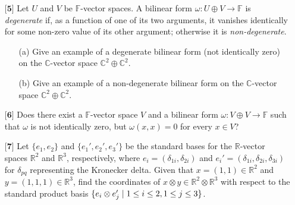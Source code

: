 \documentclass[12pt]{article}
\begin{document}
\begin{itemize}
    \vspace{.5cm}
    \item[$\textbf{[5]}$]
    Let $U$ and $V$ be $\mathbb{F}$-vector spaces. A bilinear form $\omega: U \oplus V \rightarrow \mathbb{F}$ is \textit{degenerate} if, as a function of one of its two arguments, it vanishes identically for some non-zero value of its other argument; otherwise it is \textit{non-degenerate}.
    \begin{itemize}
    
    \vspace{.3cm}
    \item[(a)]
    Give an example of a degenerate bilinear form (not identically zero) on the $\mathbb{C}$-vector space $\mathbb{C}^2 \oplus \mathbb{C}^2$.
    
    \vspace{.3cm}
    \item[(b)]
    Give an example of a non-degenerate bilinear form on the $\mathbb{C}$-vector space $\mathbb{C}^2 \oplus \mathbb{C}^2$.  
    
    \end{itemize}
    
    \vspace{.5cm}
    \item[$\textbf{[6]}$]
    Does there exist a $\mathbb{F}$-vector space $V$ and a bilinear form $\omega: V \oplus V \rightarrow \mathbb{F}$ such that $\omega$ is not identically zero, but $\omega(x,x) = 0$ for every $x \in V$?
    
    \vspace{.5cm}
    \item[$\textbf{[7]}$]
    Let $\{e_1,e_2\}$ and $\{e_1',e_2',e_3'\}$ be the standard bases for the $\mathbb{R}$-vector spaces $\mathbb{R}^2$ and $\mathbb{R}^3$, respectively, where \newline $e_i = (\delta_{1i},\delta_{2i})$ and $e_i' = (\delta_{1i},\delta_{2i},\delta_{3i})$ for $\delta_{pq}$ representing the Kronecker delta. Given that $x = (1,1) \in \mathbb{R}^2$ and $y = (1,1,1) \in \mathbb{R}^3$, find the coordinates of $x \otimes y \in \mathbb{R}^2 \otimes \mathbb{R}^3$ with respect to the standard product basis $\{e_i \otimes e_j' \hspace{.1cm} | \hspace{.1cm} 1 \leq i \leq 2, 1 \leq j \leq 3\}$. 
    

\end{itemize}
\end{document}
